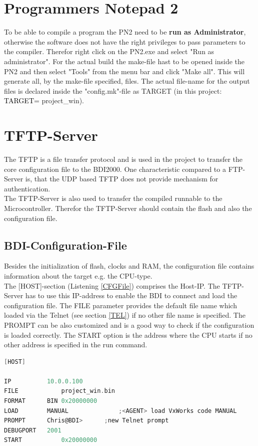 \section{Programmers Notepad 2}
To be able to compile a program the \ac{PN2} need to be \textbf{run as Administrator}, otherwise the software does not have the right privileges to pass parameters to the compiler. Therefor right click on the \ac{PN2}.exe and select "Run as administrator". For the actual build the make-file hast to be opened inside the \ac{PN2} and then select "Tools" from the menu bar and click "Make all". This will generate all, by the make-file specified, files. The actual file-name for the output files is declared inside the "config.mk"-file as TARGET (in this project: {\textcolor{black}{TARGET}}= project\_win).\\

\section{TFTP-Server} 
The \ac{TFTP} is a file transfer protocol and is used in the project to transfer the core configuration file to the BDI2000. One characteristic compared to a FTP-Server is, that the \ac{UDP} based \ac{TFTP} does not provide mechanism for authentication.\cite{TFTPWIKI}\\
The \ac{TFTP}-Server is also used to transfer the compiled runnable to the Microcontroller. Therefor the \ac{TFTP}-Server should contain the flash and also the configuration file.\\

\subsection{BDI-Configuration-File}
Besides the initialization of flash, clocks and \ac{RAM}, the configuration file contains information about the target e.g. the \ac{CPU}-type.\\
The [HOST]-section (Listening \ref{CFGFile}) comprises the Host-IP. The \ac{TFTP}-Server has to use this IP-address to enable the BDI to connect and load the configuration file. The FILE parameter provides the default file name which loaded via the Telnet (see section \ref{TEL}) if no other file name is specified. The PROMPT can be also customized and is a good way to check if the configuration is loaded correctly. The START option is the address where the \ac{CPU} starts if no other address is specified in the run command.\\
\begin{lstlisting}[language=C, caption={Extract of the rm9200dk.cfg-file}, label={CFGFile}]
[HOST]

IP          10.0.0.100
FILE	    	project_win.bin	
FORMAT	    BIN 0x20000000
LOAD        MANUAL      		;<AGENT> load VxWorks code MANUAL
PROMPT      Chris@BDI>      ;new Telnet prompt
DEBUGPORT   2001
START	    	0x20000000
\end{lstlisting}



